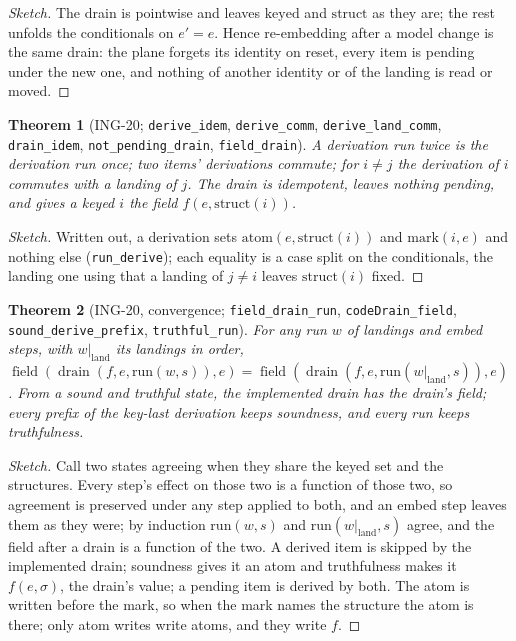 \documentclass[11pt]{article}
\theoremstyle{plain}
\newtheorem{theorem}{Theorem}[section]
\theoremstyle{definition}
\theoremstyle{remark}
\newcommand{\lean}[1]{\texttt{#1}}
\newcommand{\ing}[1]{ING-#1}
\newcommand{\field}{\operatorname{field}}
\newcommand{\drain}{\operatorname{drain}}
\begin{document}
\begin{proof}[Sketch]
The drain is pointwise and leaves $\mathrm{keyed}$ and $\mathrm{struct}$ as they are; the rest
unfolds the conditionals on $e' = e$. Hence re-embedding after a model change is the same drain:
the plane forgets its identity on reset, every item is pending under the new one, and nothing of
another identity or of the landing is read or moved.
\end{proof}

\begin{theorem}[\ing{20}; \lean{derive\_idem}, \lean{derive\_comm}, \lean{derive\_land\_comm},
\lean{drain\_idem}, \lean{not\_pending\_drain}, \lean{field\_drain}]
A derivation run twice is the derivation run once; two items' derivations commute; for $i \neq j$
the derivation of $i$ commutes with a landing of $j$. The drain is idempotent, leaves nothing
pending, and gives a keyed $i$ the field $f(e, \mathrm{struct}(i))$.
\end{theorem}

\begin{proof}[Sketch]
Written out, a derivation sets $\mathrm{atom}(e, \mathrm{struct}(i))$ and $\mathrm{mark}(i, e)$
and nothing else (\lean{run\_derive}); each equality is a case split on the conditionals, the
landing one using that a landing of $j \neq i$ leaves $\mathrm{struct}(i)$ fixed.
\end{proof}

\begin{theorem}[\ing{20}, convergence; \lean{field\_drain\_run}, \lean{codeDrain\_field},
\lean{sound\_derive\_prefix}, \lean{truthful\_run}]
For any run $w$ of landings and embed steps, with $w|_{\mathrm{land}}$ its landings in order,
$\field(\drain(f, e, \mathrm{run}(w, s)), e) = \field(\drain(f, e, \mathrm{run}(w|_{\mathrm{land}}, s)), e)$.
From a sound and truthful state, the implemented drain has the drain's field; every prefix of the
key-last derivation keeps soundness, and every run keeps truthfulness.
\end{theorem}

\begin{proof}[Sketch]
Call two states agreeing when they share the keyed set and the structures. Every step's effect on
those two is a function of those two, so agreement is preserved under any step applied to both,
and an embed step leaves them as they were; by induction $\mathrm{run}(w, s)$ and
$\mathrm{run}(w|_{\mathrm{land}}, s)$ agree, and the field after a drain is a function of the two.
A derived item is skipped by the implemented drain; soundness gives it an atom and truthfulness
makes it $f(e, \sigma)$, the drain's value; a pending item is derived by both. The atom is written
before the mark, so when the mark names the structure the atom is there; only atom writes write
atoms, and they write $f$.
\end{proof}
\end{document}
